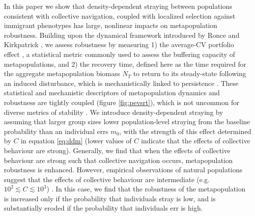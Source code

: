 \documentclass{revtex4}
\begin{document}
In this paper we show that density-dependent straying between populations consistent with collective navigation, coupled with localized selection against immigrant phenotypes has large, nonlinear impacts on metapopulation robustness.
Building upon the dynamical framework introduced by Ronce and Kirkpatrick \citep{Ronce:2001dp}, we assess robustness by measuring 
1) the average-CV portfolio effect \citep{Anderson:2013gb,Anonymous:2015gf}, a statistical metric commonly used to assess the buffering capacity of metapopulations, and
2) the recovery time, defined here as the time required for the aggregate metapopulation biomass $N_T$ to return to its steady-state following an induced disturbance, which is mechanistically linked to persistence \citep{Ovaskainen:2002il}.
These statistical and mechanistic descriptors of metapopulation dynamics and robustness are tightly coupled (figure \ref{fig:pevsrt}), which is not uncommon for diverse metrics of stability \citep{Donohue:2013iu}.
We introduce density-dependent straying by assuming that larger group sizes lower population-level straying from the baseline probability than an individual errs $m_0$, with the strength of this effect determined by $C$ in equation \ref{eq:ddm} (lower values of $C$ indicate that the effects of collective behaviour are strong).
Generally, we find that when the effects of collective behaviour are strong such that collective navigation occurs, metapopulation robustness is enhanced.
However, empirical observations of natural populations suggest that the effects of collective behaviour are intermediate (e.g. $10^{2} \lesssim C \lesssim 10^3$) \citep{Berdahl:2014bl,Berdahl:2016dx}.
In this case, we find that the robustness of the metapopulation is increased only if the probability that individuals stray is low, and is substantially eroded if the probability that individuals err is high.


\end{document}
